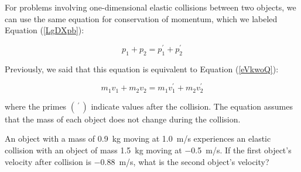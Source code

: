 \documentclass[main.tex]{subfiles}
\begin{document}
For problems involving one-dimensional elastic collisions between two objects, we can use the same equation for conservation of momentum, which we labeled Equation (\ref{LgDXpb}):

\begin{equation*}
    p_1 + p_2 = p_1^{\prime} + p_2^{\prime}
\end{equation*}

Previously, we said that this equation is equivalent to Equation (\ref{eVkwoQ}):

\begin{equation*} 
    m_1 v_1 + m_2 v_2 = m_1 v_1^{\prime} + m_2 v_2^{\prime}
\end{equation*}

where the primes $\left(\,^{\prime}\,\right)$ indicate values after the collision. The equation assumes that the mass of each object does not change during the collision.

\begin{example} \label{wXY1rT}
    An object with a mass of \SI{0.9}{kg} moving at \SI{1.0}{m/s} experiences an elastic collision with an object of mass \SI{1.5}{kg} moving at \SI{-0.5}{m/s}. If the first object's velocity after collision is \SI{-0.88}{m/s}, what is the second object's velocity?
\end{example}
\end{document}
